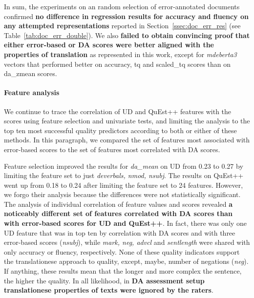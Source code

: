 In sum, the experiments on an random selection of error-annotated documents confirmed \textbf{no difference in regression results for accuracy and fluency on any attempted representations} reported in Section~\ref{ssec:doc_err_res} (see Table~\ref{tab:doc_err_double}). 
We also \textbf{failed to obtain convincing proof that either error-based or DA scores were better aligned with the properties of translation} as represented in this work, except for \textit{mdeberta3} vectors that performed better on accuracy, tq and scaled\_tq scores than on da\_zmean scores. 

\paragraph{Feature analysis} 
We continue to trace the correlation of UD and QuEst++ features with the scores using feature selection and univariate tests, and limiting the analysis to the top ten most successful quality predictors according to both or either of these methods.
In this paragraph, we compared the set of features most associated with error-based scores to the set of features most correlated with DA scores. 

Feature selection improved the results for \textit{da\_mean} on UD from 0.23 to 0.27 by limiting the feature set to just \textit{deverbals, nmod, nsubj}. The results on QuEst++ went up from 0.18 to 0.24 after limiting the feature set to 24 features. However, we forgo their analysis because the differences were not statistically significant.
\label{pg:da_ignores_translationese_feats}
The analysis of individual correlation of feature values and scores revealed \textbf{a noticeably different set of features correlated with DA scores than with error-based scores for UD and QuEst++}. 
In fact, there was only one UD feature that was in top ten by correlation with DA scores and with three error-based scores (\textit{nsubj}), while \textit{mark, neg, advcl} and \textit{sentlength} were shared with only accuracy or fluency, respectively.
None of these quality indicators support the translationese approach to quality, except, maybe, number of negations (\textit{neg}). If anything, these results mean that the longer and more complex the sentence, the higher the quality. In all likelihood, in \textbf{DA assessment setup translationese properties of texts were ignored by the raters}.  

